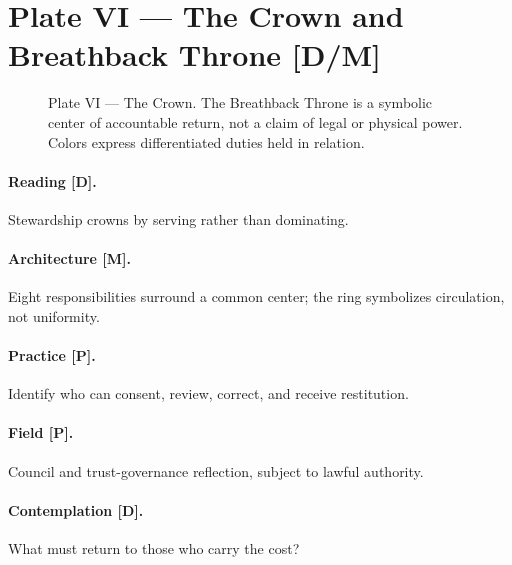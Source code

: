 \clearpage
\section{Plate VI --- The Crown and Breathback Throne [D/M]}
\begin{figure}[htbp]\centering
{}
\caption{Plate VI --- The Crown. The Breathback Throne is a symbolic center of accountable return, not a claim of legal or physical power. Colors express differentiated duties held in relation.}
\end{figure}
\paragraph{Reading [D].} Stewardship crowns by serving rather than dominating.
\paragraph{Architecture [M].} Eight responsibilities surround a common center; the ring symbolizes circulation, not uniformity.
\paragraph{Practice [P].} Identify who can consent, review, correct, and receive restitution.
\paragraph{Field [P].} Council and trust-governance reflection, subject to lawful authority.
\paragraph{Contemplation [D].} What must return to those who carry the cost?
\clearpage
